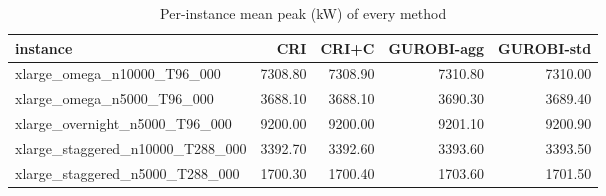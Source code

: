 \begin{table}[htbp]
\centering
\small
\caption{Per-instance mean peak (kW) of every method}
\label{tab:E3x_long_runs_xlarge_b600_per_instance}
\begin{tabular}{lrrrr}
\toprule
instance & CRI & CRI+C & GUROBI-agg & GUROBI-std \\
\midrule
xlarge\_omega\_n10000\_T96\_000 & 7308.80 & 7308.90 & 7310.80 & 7310.00 \\
xlarge\_omega\_n5000\_T96\_000 & 3688.10 & 3688.10 & 3690.30 & 3689.40 \\
xlarge\_overnight\_n5000\_T96\_000 & 9200.00 & 9200.00 & 9201.10 & 9200.90 \\
xlarge\_staggered\_n10000\_T288\_000 & 3392.70 & 3392.60 & 3393.60 & 3393.50 \\
xlarge\_staggered\_n5000\_T288\_000 & 1700.30 & 1700.40 & 1703.60 & 1701.50 \\
\bottomrule
\end{tabular}
\end{table}
